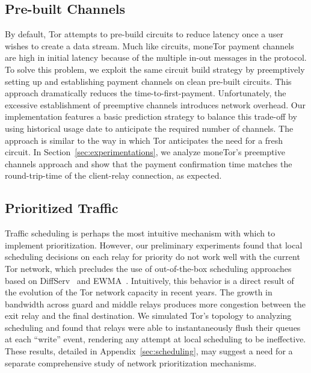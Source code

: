 \subsection{Pre-built Channels} By default, Tor attempts to pre-build circuits to reduce latency once a user wishes to create a data stream.
Much like circuits, moneTor payment channels are high in initial latency because of the multiple in-out messages in the protocol.
To solve this problem, we exploit the same circuit build strategy by preemptively setting up and establishing payment channels on clean pre-built circuits.
This approach dramatically reduces the time-to-first-payment.
Unfortunately, the excessive establishment of preemptive channels introduces network overhead.
Our implementation features a basic prediction strategy to balance this trade-off by using historical usage date to anticipate the required number of channels.
The approach is similar to the way in which Tor anticipates the need for a fresh circuit.
In Section~\ref{sec:experimentations}, we analyze moneTor's preemptive channels approach and show that the payment confirmation time matches the round-trip-time of the client-relay connection, as expected.

\subsection{Prioritized Traffic}
\label{subsub:prioritized}

Traffic scheduling is perhaps the most intuitive mechanism with which to implement prioritization.
However, our preliminary experiments found that local scheduling decisions on each relay for priority do not work well with the current Tor network, which precludes the use of out-of-the-box scheduling approaches based on DiffServ~\cite{dovrolis1999case} and EWMA~\cite{tang2010improved}.
Intuitively, this behavior is a direct result of the evolution of the Tor network capacity in recent years.
The growth in bandwidth across guard and middle relays produces more congestion between the exit relay and the final destination.
We simulated Tor's topology to analyzing scheduling and found that relays were able to instantaneously flush their queues at each ``write'' event, rendering any attempt at local scheduling to be ineffective.
These results, detailed in Appendix~\ref{sec:scheduling}, may suggest a need for a separate comprehensive study of network prioritization mechanisms.

